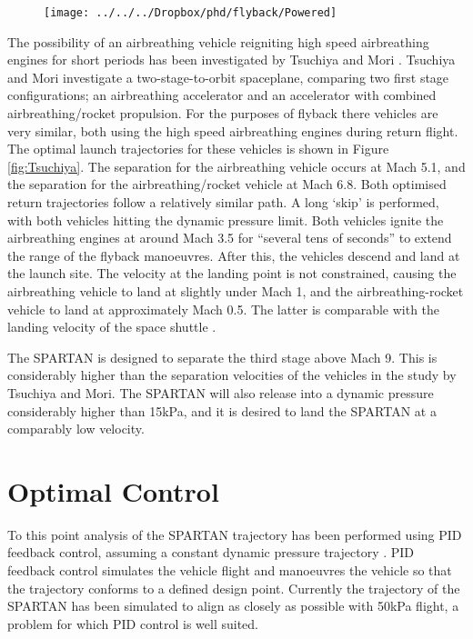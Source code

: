 \begin{figure}
\centering
\texttt{[image: ../../../Dropbox/phd/flyback/Powered]}
\caption{}
\label{fig:Powered}
\end{figure}



The possibility of an airbreathing vehicle reigniting high speed airbreathing engines for short periods has been investigated by Tsuchiya and Mori \cite{Tsuchiya2005}. Tsuchiya and Mori investigate a two-stage-to-orbit spaceplane, comparing two first stage configurations; an airbreathing accelerator and an accelerator with combined airbreathing/rocket propulsion. For the purposes of flyback there vehicles are very similar, both using the high speed airbreathing engines during return flight. The optimal launch trajectories for these vehicles is shown in Figure \ref{fig:Tsuchiya}. The separation for the airbreathing vehicle occurs at Mach 5.1, and the separation for the airbreathing/rocket vehicle at Mach 6.8. Both optimised return trajectories follow a relatively similar path. A long ‘skip’ is performed, with both vehicles hitting the dynamic pressure limit. Both vehicles ignite the airbreathing engines at around Mach 3.5 for “several tens of seconds” to extend the range of the flyback manoeuvres. After this, the vehicles descend and land at the launch site. The velocity at the landing point is not constrained, causing the airbreathing vehicle to land at slightly under Mach 1, and the airbreathing-rocket vehicle to land at approximately Mach 0.5. 
The latter is comparable with the landing velocity of the space shuttle \cite{Romere1983}. 



The SPARTAN is designed to separate the third stage above Mach 9. This is considerably higher than the separation velocities of the vehicles in the study by Tsuchiya and Mori. The SPARTAN will also release into a dynamic pressure considerably higher than 15kPa, and it is desired to land the SPARTAN at a comparably low velocity.

\section{Optimal Control}


To this point analysis of the SPARTAN trajectory has been performed using PID feedback control, assuming a constant dynamic pressure trajectory \cite{Preller2015}. PID feedback control simulates the vehicle flight and manoeuvres the vehicle so that the trajectory conforms to a defined design point. Currently the trajectory of the SPARTAN has been simulated to align as closely as possible with 50kPa flight, a problem for which PID control is well suited. 

